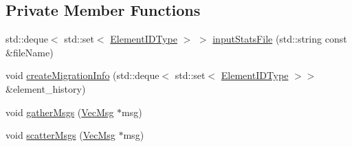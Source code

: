 \subsection*{Private Member Functions}
\begin{DoxyCompactItemize}
\item 
std\+::deque$<$ std\+::set$<$ \hyperlink{namespacevt_1_1vrt_1_1collection_1_1balance_a592736f733df4f90856df90a1fd08905}{Element\+I\+D\+Type} $>$ $>$ \hyperlink{structvt_1_1vrt_1_1collection_1_1balance_1_1_stats_restart_reader_ae93a904baed4e7e5e8fd85f61848a4ac}{input\+Stats\+File} (std\+::string const \&file\+Name)
\item 
void \hyperlink{structvt_1_1vrt_1_1collection_1_1balance_1_1_stats_restart_reader_a357379003c1041ddcfba382bb9393129}{create\+Migration\+Info} (std\+::deque$<$ std\+::set$<$ \hyperlink{namespacevt_1_1vrt_1_1collection_1_1balance_a592736f733df4f90856df90a1fd08905}{Element\+I\+D\+Type} $>$$>$ \&element\+\_\+history)
\item 
void \hyperlink{structvt_1_1vrt_1_1collection_1_1balance_1_1_stats_restart_reader_a7c0adbbe2dd2b7b3f0f42687abe3211e}{gather\+Msgs} (\hyperlink{structvt_1_1vrt_1_1collection_1_1balance_1_1_stats_restart_reader_a7e2a74977e595242bf3abb6c83b7e27b}{Vec\+Msg} $\ast$msg)
\item 
void \hyperlink{structvt_1_1vrt_1_1collection_1_1balance_1_1_stats_restart_reader_a6c355461ab40a4efe65ff3d1351a66d1}{scatter\+Msgs} (\hyperlink{structvt_1_1vrt_1_1collection_1_1balance_1_1_stats_restart_reader_a7e2a74977e595242bf3abb6c83b7e27b}{Vec\+Msg} $\ast$msg)
\end{DoxyCompactItemize}

